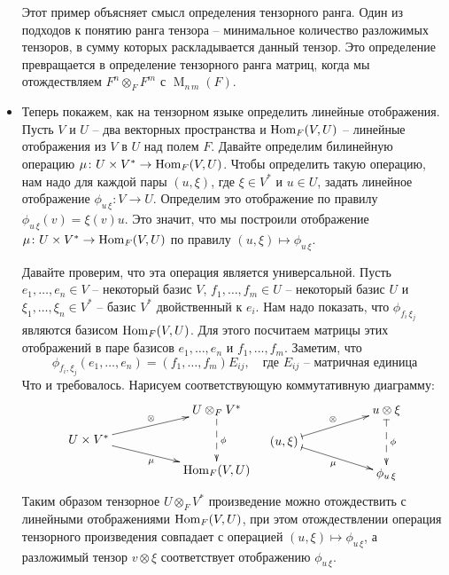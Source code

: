 \begin{itemize}
Этот пример объясняет смысл определения тензорного ранга.
Один из подходов к понятию ранга тензора -- минимальное количество разложимых тензоров, в сумму которых раскладывается данный тензор.
Это определение превращается в определение тензорного ранга матриц, когда мы отождествляем $F^n\otimes_F F^m$ с $\operatorname{M}_{n\,m}(F)$.

\item Теперь покажем, как на тензорном языке определить линейные отображения.
Пусть $V$ и $U$ -- два векторных пространства и $\operatorname{Hom}_F(V, U)$ -- линейные отображения из $V$ в $U$ над полем $F$.
Давайте определим билинейную операцию $\mu \colon U\times V^* \to \operatorname{Hom}_F(V, U)$.
Чтобы определить такую операцию, нам надо для каждой пары $(u,\xi)$, где $\xi \in V^*$ и $u\in U$, задать линейное отображение $\phi_{u\,\xi}\colon V\to U$.
Определим это отображение по правилу $\phi_{u\,\xi}(v) = \xi(v)u$.
Это значит, что мы построили отображение $\mu\colon U\times V^* \to \operatorname{Hom}_F(V, U)$ по правилу $(u,\xi)\mapsto \phi_{u\,\xi}$.

Давайте проверим, что эта операция является универсальной.
Пусть $e_1,\ldots,e_n\in V$ -- некоторый базис $V$, $f_1,\ldots,f_m\in U$ -- некоторый базис $U$ и $\xi_1,\ldots,\xi_n\in V^*$ -- базис $V^*$ двойственный к $e_i$.
Нам надо показать, что $\phi_{f_i\,\xi_j}$ являются базисом $\operatorname{Hom}_F(V, U)$.
Для этого посчитаем матрицы этих отображений в паре базисов $e_1,\ldots,e_n$ и $f_1,\ldots,f_m$.
Заметим, что
\[
\phi_{f_i, \xi_j}(e_1,\ldots,e_n) = (f_1,\ldots,f_m)E_{ij},\quad\text{где $E_{ij}$ -- матричная единица}
\]
Что и требовалось.
Нарисуем соответствующую коммутативную диаграмму:
\[
\xymatrix@R=10pt{
	{}&{}&{U\otimes_F V^*}\ar@{-->}[dd]^{\phi}\\
	{U\times V^*}\ar[urr]^{\otimes}\ar[drr]_{\mu}&{}&{}\\
	{}&{}&{\Hom_F(V, U)}\\
}
\quad
\xymatrix@R=10pt{
	{}&{}&{u\otimes \xi}\ar@{|-->}[dd]^{\phi}\\
	{(u, \xi)}\ar@{|->}[urr]^{\otimes}\ar@{|->}[drr]_{\mu}&{}&{}\\
	{}&{}&{\phi_{u\,\xi}}\\
}
\]
Таким образом тензорное $U\otimes_F V^*$ произведение можно отождествить с линейными отображениями $\operatorname{Hom}_F(V, U)$, при этом отождествлении операция тензорного произведения совпадает с операцией $(u, \xi)\mapsto \phi_{u\,\xi}$, а разложимый тензор $v\otimes \xi$ соответствует отображению $\phi_{u\,\xi}$.
\end{itemize}

